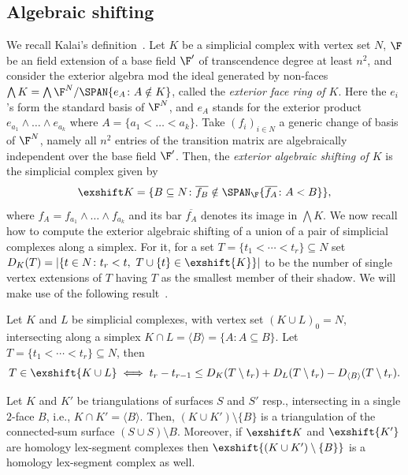 \subsection{Algebraic shifting}
We recall Kalai's definition~\cite{KalaiPart1}.
Let $K$ be a simplicial complex with vertex set $N$, $\F$ be an field extension of a base field $\F'$ of transcendence degree at least $n^2$, and consider the exterior algebra mod the ideal generated by non-faces $\bigwedge K = \bigwedge \F^{N}/\SPAN \{e_A \colon A \notin K\}$, called the  \emph{exterior face ring of $K$}. Here the $e_i$'s form the standard basis of $\F^{N}$, and $e_A$ stands for the exterior product $e_{a_1}\wedge\ldots\wedge e_{a_k}$ where $A=\{a_1<\ldots<a_k\}$.
Take $(f_i)_{i\in N}$ a generic change of basis of $\F^{N}$, namely all $n^2$ entries of the transition matrix are algebraically independent over the base field $\F'$. Then, the \emph{exterior algebraic shifting of $K$} is the simplicial complex given by $$\exshift K = \{B \subseteq N \colon \overline{f_B} \notin \SPAN_{\F} \{\overline{f_A}\colon A<B\}\},$$
where $f_A=f_{a_1}\wedge\ldots\wedge f_{a_k}$ and its bar $\overline{f_A}$ denotes its image in $\bigwedge K$.
%
We now recall how to compute the exterior algebraic shifting of a union of a pair of simplicial complexes along a simplex. For it, for a set $T=\{t_1<\cdots <t_r\}\subseteq N$ set $D_K(T) = |\{ t \in N \colon t_r<t,~T\cup \{t\} \in \exshift{K} \}|$ to be the number of single vertex extensions of $T$ having $T$ as the smallest member of their shadow. We will make use of the following result~\cite[Theorem 4.6]{nevo05-basic}.
\begin{theorem}
  \label{t:simplex-union}
  Let $K$ and $L$ be simplicial complexes, with vertex set $(K\cup L)_0 = N$, intersecting along a simplex $K\cap L = \langle B\rangle = \{A \colon A\subseteq B\}$. Let $T=\{t_1<\cdots <t_r\}\subseteq N$, then
  $$T\in \exshift{K\cup L} \iff t_r-t_{r-1}\leq D_K(T\setminus t_r)+D_L(T\setminus t_r)-D_{\langle B \rangle}(T\setminus t_r).$$
%
\end{theorem}
%
%
\begin{corollary}
  \label{c:gluehomlex}
  Let $K$ and $K'$ be triangulations of surfaces $S$ and $S'$ resp., intersecting in  
  a single $2$-face $B$, i.e., $K\cap K' = \langle B\rangle$.
  Then, $(K\cup K')\setminus \{B\}$ is a triangulation of the connected-sum surface $(S\cup S) \setminus B$.
  Moreover, if $\exshift K$ and $\exshift{K'}$ are homology lex-segment complexes then $\exshift{(K\cup K') \setminus \{ B \} }$ is a homology lex-segment complex as well.
\end{corollary}
